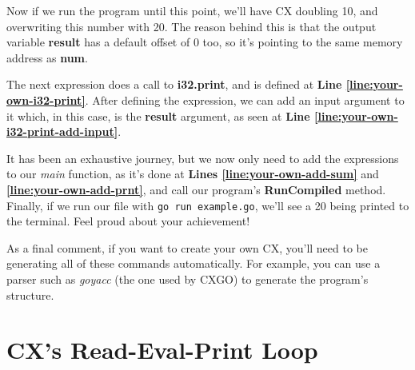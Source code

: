 \documentclass[11pt,fleqn,openany]{book} %
\begin{document}
Now if we run the program until this point, we'll have CX doubling 10, and overwriting this number with 20. The reason behind this is that the output variable \textbf{result} has a default offset of 0 too, so it's pointing to the same memory address as \textbf{num}.

The next expression does a call to \textbf{i32.print}, and is defined at \textbf{Line \ref{line:your-own-i32-print}}. After defining the expression, we can add an input argument to it which, in this case, is the \textbf{result} argument, as seen at \textbf{Line \ref{line:your-own-i32-print-add-input}}.

It has been an exhaustive journey, but we now only need to add the expressions to our \emph{main} function, as it's done at \textbf{Lines \ref{line:your-own-add-sum}} and \textbf{\ref{line:your-own-add-prnt}}, and call our program's \textbf{RunCompiled} method. Finally, if we run our file with \lstinline{go run example.go}, we'll see a 20 being printed to the terminal. Feel proud about your achievement!

As a final comment, if you want to create your own CX, you'll need to be generating all of these commands automatically. For example, you can use a parser such as \emph{goyacc} (the one used by CXGO) to generate the program's structure. 


\chapter{CX's Read-Eval-Print Loop}
\label{chapter:mastering-the-repl}

\end{document}
